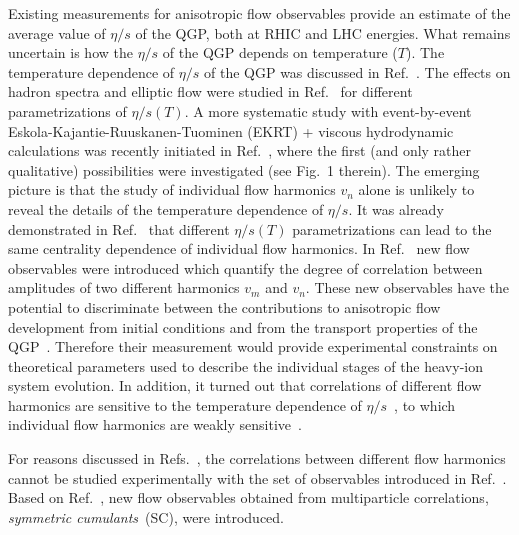 Existing measurements for anisotropic flow observables provide an estimate of the average value of $\eta/s$ of the QGP, both at RHIC and LHC energies. What remains uncertain is how the $\eta/s$ of the QGP depends on temperature ($T$). The temperature dependence of $\eta/s$ of the QGP was discussed in Ref.~\cite{Csernai:2006zz}. The effects on hadron spectra and elliptic flow were studied in Ref.~\cite{Niemi:2011ix} for different parametrizations of $\eta/s(T)$.  A more systematic study with event-by-event Eskola-Kajantie-Ruuskanen-Tuominen (EKRT) + viscous hydrodynamic calculations was recently initiated in Ref.~\cite{Niemi:2015qia}, where the first (and only rather qualitative) possibilities were investigated (see Fig.~1 therein). The emerging picture is that the study of individual flow harmonics $v_n$ alone is unlikely to reveal the details of the temperature dependence of $\eta/s$.
It was already demonstrated in Ref.~\cite{Niemi:2015qia} that different $\eta/s(T)$ parametrizations can lead to the same centrality dependence of individual flow harmonics. In Ref.~\cite{Niemi:2012aj} new flow observables were introduced which quantify the degree of correlation between amplitudes of two different harmonics $v_m$ and $v_n$. These new observables have the potential to discriminate between the contributions to anisotropic flow development from initial conditions and from the transport properties of the QGP~\cite{Niemi:2012aj}. Therefore their measurement would provide experimental constraints on theoretical parameters used to describe the individual stages of the heavy-ion system evolution. In addition, it turned out that correlations of different flow harmonics are sensitive to the temperature dependence of $\eta/s$~\cite{ALICE:2016kpq}, to which individual flow harmonics are weakly sensitive~\cite{Niemi:2015qia}. 
 
For reasons discussed in Refs.~\cite{ALICE:2016kpq,Bilandzic:2013kga}, the correlations between different flow harmonics cannot be studied experimentally with the set of observables introduced in Ref.~\cite{Niemi:2012aj}. 
Based on Ref.~\cite{Bilandzic:2013kga}, new flow observables obtained from multiparticle correlations, \textit{symmetric cumulants}~(SC), were introduced. 

